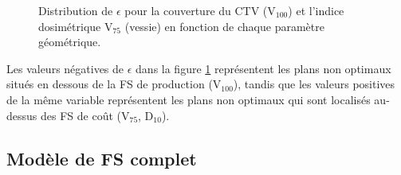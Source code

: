 %
\begin{figure}[ht!]
  \centering
  \hspace{0.5cm}
\caption{\label{ModeleFS-Boxplot} Distribution de $\epsilon$ pour la couverture du CTV (V$_{100}$) et l'indice dosimétrique V$_{75}$ (vessie) en fonction de chaque paramètre géométrique.}
\end{figure}
%
Les valeurs négatives de $\epsilon$ dans la figure \ref{ModeleFS-Boxplot} représentent les plans non optimaux situés en dessous de la FS de production (V$_{100}$), tandis que les valeurs positives de la même variable représentent les plans non optimaux qui sont localisés au-dessus des FS de coût (V$_{75}$, D$_{10}$).
%
\subsection{Modèle de FS complet} \label{subsec:Comb.Lineaire}
